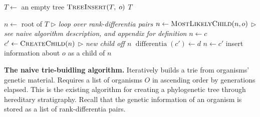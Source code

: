 \begin{algorithm}[h]
    \begin{algorithmic}[1]
    \small{
            \State $T \gets$ an empty tree
                \State $\textsc{TreeInsert}(T,\; o)$
            \EndFor
            \State \Return $T$
        \EndFunction

            \State $n \gets$ root of $T$
             \text{ } $\triangleright$ \textit{loop over rank-differentia pairs}
                \State $n \gets \textsc{MostLikelyChild}(n, o)$ \text{ } $\triangleright$ \textit{see naive algorithm description, and appendix for definition}
                    \State $n \gets c$
                \Else 
                    \State $c' \gets \textsc{CreateChild}(n)$ \text{ } $\triangleright$ \textit{new child off $n$} 
                    \State $\operatorname{differentia}(c') \gets d$
                    \State $n \gets c'$
                \EndIf
            \EndFor
            \State insert information about $o$ as a child of $n$
        \EndFunction
    }
    \end{algorithmic}
    \caption{\textbf{The naive trie-buidling algorithm.} \small Iteratively builds a trie from organisms' genetic material. Requires a list of organisms $O$ in ascending order by generations elapsed. This is the existing algorithm for creating a phylogenetic tree through hereditary stratigraphy. Recall that the genetic information of an organism is stored as a list of rank-differentia pairs. \vspace{-1.5em}}
    \label{alg:old}
\end{algorithm}
